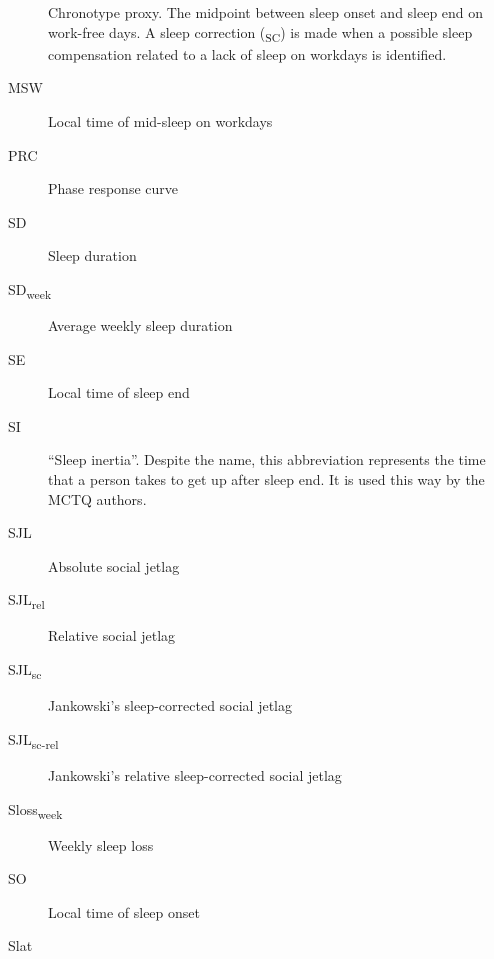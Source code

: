 \begin{siglas}
\begin{description}
Chronotype proxy. The midpoint between sleep onset and sleep end on
work-free days. A sleep correction (\textsubscript{SC}) is made when a
possible sleep compensation related to a lack of sleep on workdays is
identified.
\item[MSW]
\hspace{20cm}

Local time of mid-sleep on workdays
\item[PRC]
\hspace{20cm}

Phase response curve
\item[SD]
\hspace{20cm}

Sleep duration
\item[SD\textsubscript{week}]
\hspace{20cm}

Average weekly sleep duration
\item[SE]
\hspace{20cm}

Local time of sleep end
\item[SI]
\hspace{20cm}

``Sleep inertia''. Despite the name, this abbreviation represents the
time that a person takes to get up after sleep end. It is used this way
by the MCTQ authors.
\item[SJL]
\hspace{20cm}

Absolute social jetlag
\item[SJL\textsubscript{rel}]
\hspace{20cm}

Relative social jetlag
\item[SJL\textsubscript{sc}]
\hspace{20cm}

Jankowski's sleep-corrected social jetlag
\item[SJL\textsubscript{sc-rel}]
\hspace{20cm}

Jankowski's relative sleep-corrected social jetlag
\item[Sloss\textsubscript{week}]
\hspace{20cm}

Weekly sleep loss
\item[SO]
\hspace{20cm}

Local time of sleep onset
\item[Slat]
\hspace{20cm}


\end{description}
\end{siglas}

